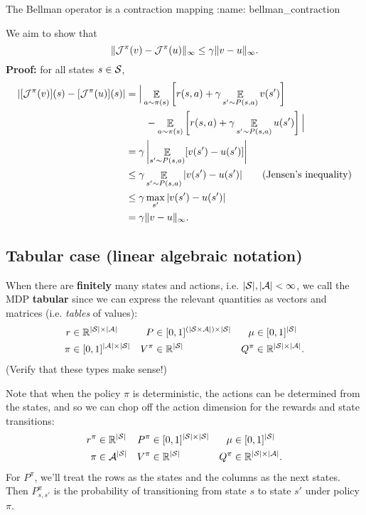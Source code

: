 \documentclass[\main/main]{subfiles}
\begin{document}
\begin{theorem}{The Bellman operator is a contraction mapping}
:name: bellman_contraction


We aim to show that
\[
    \|\bop^{\pi} (v) - \bop^{\pi} (u) \|_{\infty} \le \gamma \|v - u \|_{\infty}.
\]
\textbf{Proof:} for all states $s \in \S$,
\begin{align*}
|[\bop^{\pi} (v)](s) - [\bop^{\pi} (u)](s)|&= \Big| \mathop{\mathbb{E}}_{a \sim \pi(s)} \left[ r(s, a) + \gamma \mathop{\mathbb{E}}_{s' \sim P(s, a)} v(s') \right] \\
&\qquad - \mathop{\mathbb{E}}_{a \sim \pi(s)} \left[r(s, a) + \gamma \mathop{\mathbb{E}}_{s' \sim P(s, a)} u(s') \right] \Big| \\
&= \gamma \left|\mathop{\mathbb{E}}_{s' \sim P(s, a)} [v(s') - u(s')] \right| \\
&\le \gamma \mathop{\mathbb{E}}_{s' \sim P(s, a)}|v(s') - u(s')| \qquad \text{(Jensen's inequality)} \\
&\le \gamma \max_{s'} |v(s') - u(s')| \\
&= \gamma \|v - u \|_{\infty}.
\end{align*}

\end{theorem}

\subsection{Tabular case (linear algebraic notation)}

When there are \textbf{finitely} many states and actions, i.e. $|\S|, |\A| < \infty$, we call the MDP \textbf{tabular} since we can express the relevant quantities as vectors and matrices (i.e. \emph{tables} of values):
\begin{align*}
    r &\in \R^{|\S| \times |\A|} &
    P &\in [0, 1]^{(|\S \times \A|) \times |\S|} &
    \mu &\in [0, 1]^{|\S|} \\
    \pi &\in [0, 1]^{|\A| \times |\S|} &
    V^\pi &\in \R^{|\S|} &
    Q^\pi &\in \R^{|\S| \times |\A|}.
\end{align*}
(Verify that these types make sense!)

Note that when the policy $\pi$ is deterministic, the actions can be determined from the states, and so we can chop off the action dimension for the rewards and state transitions:
\begin{align*}
    r^{\pi} &\in \R^{|\S|} & P^{\pi} &\in [0, 1]^{|\S| \times |\S|} & \mu &\in [0, 1]^{|\S|} \\
    \pi &\in \A^{|\S|} & V^\pi &\in \R^{|\S|} & Q^\pi &\in \R^{|\S| \times |\A|}.
\end{align*}
For $P^\pi$, we'll treat the rows as the states and the columns as the next states. Then $P^\pi_{s, s'}$ is the probability of transitioning from state $s$ to state $s'$ under policy $\pi$.
\end{document}
